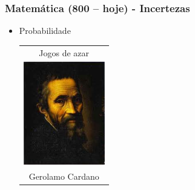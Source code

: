 \documentclass[aspectratio=169]{beamer}
\begin{document}
	\begin{frame}
		\frametitle{Matemática (800 – hoje) - Incertezas}
		\begin{itemize}
			\item Probabilidade			
			
			\begin{table}
				\centering
				\begin{tabular}{c}
					Jogos de azar \\				
					\includegraphics[height=4.5cm, keepaspectratio]{../figs/cap01/cardano.jpg} \\
					Gerolamo Cardano  		
					
				\end{tabular}
			\end{table}
		\end{itemize}
	\end{frame}
\end{document}

